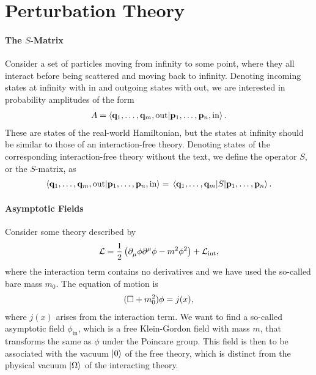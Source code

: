 \section{Perturbation Theory}

\paragraph{The $S$-Matrix}
Consider a set of particles moving from infinity to some point, where they all interact before being scattered and moving back to infinity. Denoting incoming states at infinity with in and outgoing states with out, we are interested in probability amplitudes of the form
\begin{align*}
	A = \braket{\vb{q}_{1}, \dots, \vb{q}_{m}, \text{out}}{\vb{p}_{1}, \dots, \vb{p}_{n}, \text{in}}.
\end{align*}
These are states of the real-world Hamiltonian, but the states at infinity should be similar to those of an interaction-free theory. Denoting states of the corresponding interaction-free theory without the text, we define the operator $S$, or the $S$-matrix, as
\begin{align*}
	\braket{\vb{q}_{1}, \dots, \vb{q}_{m}, \text{out}}{\vb{p}_{1}, \dots, \vb{p}_{n}, \text{in}} = \mel{\vb{q}_{1}, \dots, \vb{q}_{m}}{S}{\vb{p}_{1}, \dots, \vb{p}_{n}}.
\end{align*}

\paragraph{Asymptotic Fields}
Consider some theory described by
\begin{align*}
	\mathcal{L} = \frac{1}{2}\left(\partial^{}_{\mu}\phi\partial^{\mu}_{}\phi - m^{2}\phi^{2}\right) + \mathcal{L}_{\text{int}},
\end{align*}
where the interaction term contains no derivatives and we have used the so-called bare mass $m_{0}$. The equation of motion is
\begin{align*}
	(\square  + m_{0}^{2})\phi = j(x),
\end{align*}
where $j(x)$ arises from the interaction term. We want to find a so-called asymptotic field $\phi_{\text{in}}$, which is a free Klein-Gordon field with mass $m$, that transforms the same as $\phi$ under the Poincare group. This field is then to be associated with the vacuum $\ket{0}$ of the free theory, which is distinct from the physical vacuum $\ket{\Omega}$ of the interacting theory.

